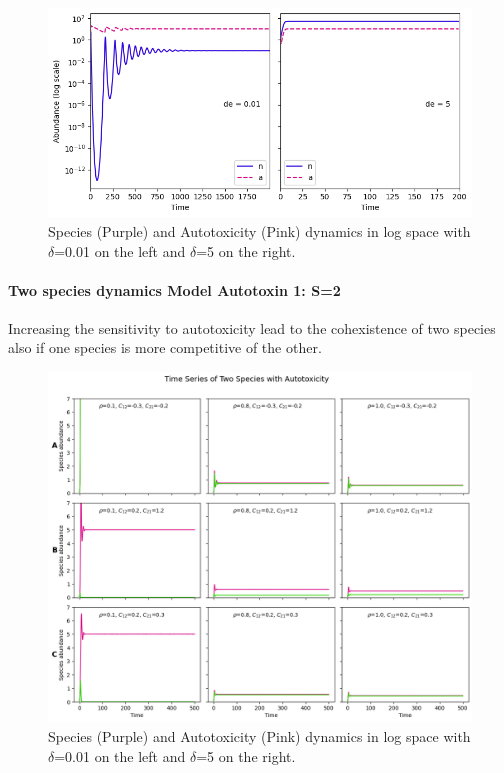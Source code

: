 \documentclass[11pt,a4paper,fleqn]{scrartcl}
\begin{document}
\begin{figure}[h!]
    \centering
    \includegraphics[width=\linewidth]{SingleSpecies/Model01species.png}
    \caption{Species (Purple) and Autotoxicity (Pink) dynamics in log space with $\delta$=0.01 on the left and $\delta$=5 on the right.}
\end{figure}
\label{simulationOneSpeciesModel0}


\clearpage
\paragraph{Two species dynamics Model Autotoxin 1: S=2}
Increasing the sensitivity to autotoxicity lead to the cohexistence of two species also if one species is more competitive of the other.

\begin{figure}[h!]
    \centering
    \includegraphics[width=\linewidth]{SingleSpecies/twospeciesModel0.png}
    \caption{Species (Purple) and Autotoxicity (Pink) dynamics in log space with $\delta$=0.01 on the left and $\delta$=5 on the right.}
\end{figure}
\label{simulationOneSpeciesModel0}
\end{document}
